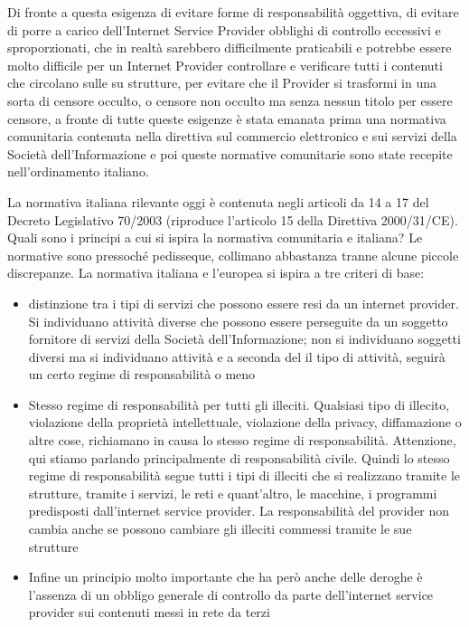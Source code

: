Di fronte a questa esigenza di evitare forme di responsabilità oggettiva, di evitare di porre a carico dell'Internet Service Provider obblighi di controllo eccessivi e sproporzionati, che in realtà sarebbero difficilmente praticabili e potrebbe essere molto difficile per un Internet Provider controllare e verificare tutti i contenuti che circolano sulle su strutture, per evitare che il Provider si trasformi in una sorta di censore occulto, o censore non occulto ma senza nessun titolo per essere censore, a fronte di tutte queste esigenze è stata emanata prima una normativa comunitaria contenuta nella direttiva sul commercio elettronico e sui servizi della Società dell'Informazione e poi queste normative comunitarie sono state recepite nell'ordinamento italiano. 

La normativa italiana rilevante oggi è contenuta negli articoli da 14 a 17 del Decreto Legislativo 70/2003 (riproduce l'articolo 15 della Direttiva 2000/31/CE). Quali sono i principi a cui si ispira la normativa  comunitaria e italiana? Le normative sono pressoché pedisseque, collimano abbastanza tranne alcune piccole discrepanze. 
La normativa italiana e l'europea si ispira a tre criteri di base:

\begin{itemize}
    \item distinzione tra i tipi di servizi che possono essere resi da un internet provider. Si individuano attività diverse che possono essere perseguite da un soggetto fornitore di servizi della Società dell'Informazione; non si individuano soggetti diversi ma si individuano attività e a seconda del il tipo di attività, seguirà un certo regime di responsabilità o meno
    \item  Stesso regime di responsabilità per tutti gli illeciti. Qualsiasi tipo di illecito, violazione della proprietà intellettuale, violazione della privacy, diffamazione o altre cose, richiamano in causa lo stesso regime di responsabilità. Attenzione, qui stiamo parlando principalmente di responsabilità civile. Quindi lo stesso regime di responsabilità segue tutti i tipi di illeciti che si realizzano tramite le strutture, tramite i servizi, le reti e quant'altro, le macchine, i programmi predisposti dall'internet service provider. La responsabilità del provider non cambia anche se possono cambiare gli illeciti commessi tramite le sue strutture
    \item Infine un principio molto importante che ha però anche delle deroghe è l'assenza di un obbligo generale di controllo da parte dell'internet service provider sui contenuti messi in rete da terzi
\end{itemize}

